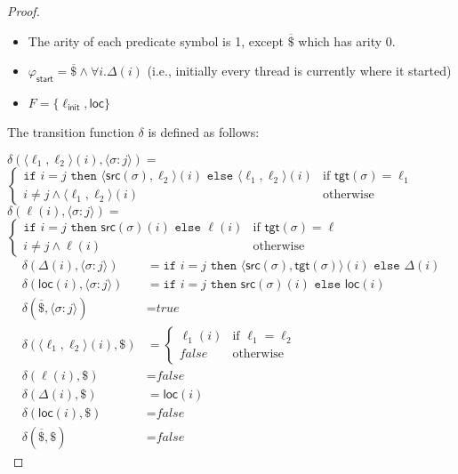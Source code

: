\documentclass[9pt,nocopyrightspace]{sigplanconf}
\theoremstyle{definition}
\newcommand{\tuple}[1]{\langle #1 \rangle}
\newcommand{\true}{\textit{true}}
\newcommand{\false}{\textit{false}}
\newcommand{\ic}[2]{{\tuple{#1 : #2}}}
\newcommand{\src}{\textsf{src}}
\newcommand{\tgt}{\textsf{tgt}}
\newcommand{\init}{\textsf{init}}
\newcommand{\loc}{\mathsf{loc}}
\newcommand{\start}{\mathsf{start}}
\renewcommand{\phi}{\varphi}
\newcommand{\ite}[3]{\texttt{if }#1\texttt{ then }#2\texttt{ else } #3}
\begin{document}
\begin{proof}
\begin{itemize}
  \item The arity of each predicate symbol is 1, except $\overline{\$}$ which has
    arity 0.
  \item $\phi_\start = \overline{\$} \land \forall i. \Delta(i)$ (i.e.,
    initially every thread is currently where it started)
  \item $F = \{ \ell_\init, \loc \}$
  \end{itemize}
  The transition function $\delta$ is defined as follows: {\small

    \vspace*{1pt}
    \noindent$\delta(\tuple{\ell_1,\ell_2}(i), \ic{\sigma}{j}) =$\\
    \null\hfill$\begin{cases}
      \ite{i=j}{\tuple{\src(\sigma),\ell_2}(i)}{\tuple{\ell_1,\ell_2}(i)} & \text{if } \tgt(\sigma) = \ell_1\\
      i \neq j \land \tuple{\ell_1,\ell_2}(i) &\text{otherwise}
    \end{cases}$\\

    \noindent$\delta(\ell(i), \ic{\sigma}{j}) =$\\
    \null\hfill$\begin{cases}
      \ite{i=j}{\src(\sigma)(i)}{\ell(i)} & \text{if } \tgt(\sigma) = \ell\\
      i \neq j \land \ell(i) &\text{otherwise}
    \end{cases}$
  \begin{align*}
    \delta(\Delta(i), \ic{\sigma}{j}) &= \ite{i=j}{\tuple{\src(\sigma),\tgt(\sigma)}(i)}{\Delta(i)}\\
    \delta(\loc(i), \ic{\sigma}{j}) &= \ite{i=j}{\src(\sigma)(i)}{\loc(i)}\\
    \delta(\overline{\$}, \ic{\sigma}{j}) &= \true\\
    \delta(\tuple{\ell_1,\ell_2}(i), \$) &= \begin{cases}
      \ell_1(i) & \text{if } \ell_1 = \ell_2\\
      \false &\text{otherwise}
    \end{cases}\\
    \delta(\ell(i), \$) &= \false\\
    \delta(\Delta(i), \$) &= \loc(i)\\
    \delta(\loc(i), \$) &= \false\\
    \delta(\overline{\$}, \$) &= \false
  \end{align*}
  }
\end{proof}
\end{document}
